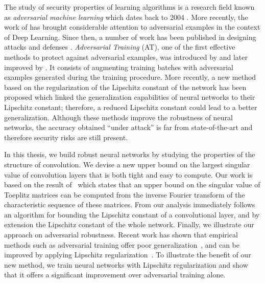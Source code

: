 The study of security properties of learning algorithms is a research field known as \emph{adversarial machine learning} which dates back to 2004 \cite{dalvi2004adversarial}.
More recently, the work of \citet{szegedy2013intriguing} has brought considerable attention to adversarial examples in the context of Deep Learning.
Since then, a number of work has been published in designing attacks and defenses \cite{szegedy2013intriguing,goodfellow2014explaining,papernot2016limitations,madry2018towards,carlini2017towards,pinot2019theoretical}.
\emph{Adversarial Training} (AT), one of the first effective methods to protect against adversarial examples, was introduced by \citet{goodfellow2014explaining} and later improved by \citet{madry2018towards}.
It consists of augmenting training batches with adversarial examples generated during the training procedure.
More recently, a new method \cite{farnia2018generalizable} based on the regularization of the Lipschitz constant of the network has been proposed which linked the generalization capabilities of neural networks to their Lipschitz constant; therefore, a reduced Lipschitz constant could lead to a better generalization.
Although these methods improve the robustness of neural networks, the accuracy obtained ``under attack'' is far from state-of-the-art and therefore security risks are still present.

In this thesis, we build robust neural networks by studying the properties of the structure of convolution.
We devise a new upper bound on the largest singular value of convolution layers that is both tight and easy to compute. 
Our work is based on the result of~\citet{gray2006toeplitz} which states that an upper bound on the singular value of Toeplitz matrices can be computed from the inverse Fourier transform of the characteristic sequence of these matrices.
From our analysis immediately follows an algorithm for bounding the Lipschitz constant of a convolutional layer, and by extension the Lipschitz constant of the whole network.
Finally, we illustrate our approach on adversarial robustness. 
Recent work has shown that empirical methods such as adversarial training offer poor generalization~\cite{schmidt2018adversarially}, and can be improved by applying Lipschitz regularization~\cite{farnia2018generalizable}.
To illustrate the benefit of our new method, we train neural networks with Lipschitz regularization and show that it offers a significant improvement over adversarial training alone.





